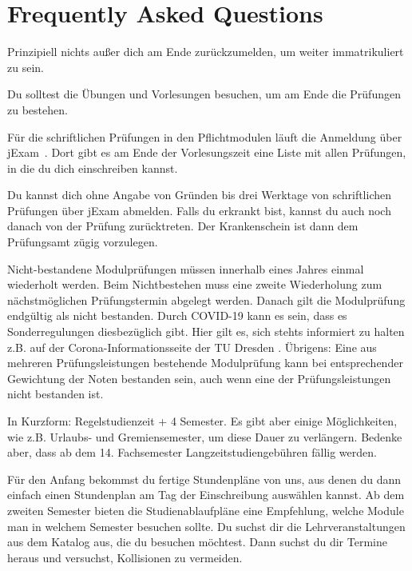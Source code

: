 \chapter*{Frequently Asked Questions}
\label{sec:faq}
Prinzipiell nichts außer dich am Ende zurückzumelden, um weiter immatrikuliert zu sein.

Du solltest die Übungen und Vorlesungen besuchen, um am Ende die Prüfungen zu bestehen.

Für die schriftlichen Prüfungen in den Pflichtmodulen läuft die Anmeldung über jExam~.
Dort gibt es am Ende der Vorlesungszeit eine Liste mit allen Prüfungen, in die du dich einschreiben kannst.

Du kannst dich ohne Angabe von Gründen bis drei Werktage von schriftlichen Prüfungen über jExam abmelden. Falls du erkrankt bist, kannst du auch noch danach von der Prüfung zurücktreten. Der Krankenschein ist dann dem Prüfungsamt zügig vorzulegen.

Nicht-bestandene Modulprüfungen müssen innerhalb eines Jahres einmal wiederholt werden. Beim Nichtbestehen muss eine zweite Wiederholung zum nächstmöglichen Prüfungstermin abgelegt werden. Danach gilt die Modulprüfung endgültig als nicht bestanden. 
Durch COVID-19 kann es sein, dass es Sonderregulungen diesbezüglich gibt. Hier gilt es, sich stehts informiert zu halten z.B. auf der Corona-Informationsseite der TU Dresden . 
Übrigens: Eine aus mehreren Prüfungsleistungen bestehende Modulprüfung kann bei entsprechender Gewichtung der Noten bestanden sein, auch wenn eine der Prüfungsleistungen nicht bestanden ist.

In Kurzform: Regelstudienzeit + 4 Semester. Es gibt aber einige Möglichkeiten, wie z.B. Urlaubs- und Gremiensemester, um diese Dauer zu verlängern. Bedenke aber, dass ab dem 14. Fachsemester Langzeitstudiengebühren fällig werden.

Für den Anfang bekommst du fertige Stundenpläne von uns, aus denen du dann einfach einen Stundenplan am Tag der Einschreibung auswählen kannst. Ab dem zweiten Semester bieten die Studienablaufpläne eine Empfehlung, welche Module man in welchem Semester besuchen sollte. Du suchst dir die Lehrveranstaltungen aus dem Katalog aus, die du besuchen möchtest. Dann suchst du dir Termine heraus und versuchst, Kollisionen zu vermeiden.

